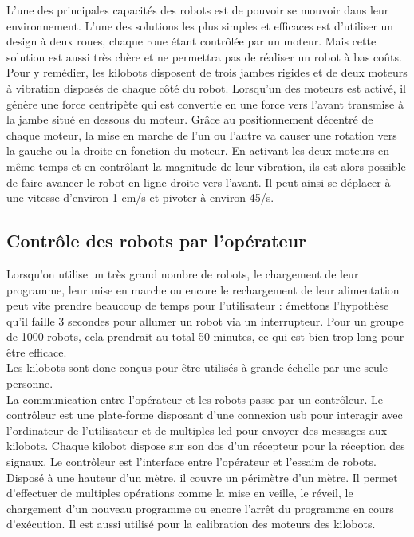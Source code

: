 \documentclass[a4paper,8pt]{report}
\begin{document}
L'une des principales capacit\'es des robots est de pouvoir se mouvoir dans leur environnement. L'une des solutions les plus simples et efficaces est d'utiliser un design \`a deux roues, chaque roue \'etant contr\^ol\'ee par un moteur. Mais cette solution est aussi tr\`es ch\`ere et ne permettra pas de r\'ealiser un robot \`a bas co\^uts. \\
Pour y rem\'edier, les kilobots disposent de trois jambes rigides et de deux moteurs \`a vibration dispos\'es de chaque c\^ot\'e du robot. Lorsqu'un des moteurs est activ\'e, il g\'en\`ere une force centrip\`ete qui est convertie en une force vers l'avant transmise \`a la jambe situ\'e en dessous du moteur. Gr\^ace au positionnement d\'ecentr\'e de chaque moteur, la mise en marche de l'un ou l'autre va causer une rotation vers la gauche ou la droite en fonction du moteur. En activant les deux moteurs en m\^eme temps et en contr\^olant la magnitude de leur vibration, ils est alors possible de faire avancer le robot en ligne droite vers l'avant. Il peut ainsi se d\'eplacer \`a une vitesse d'environ 1 cm/s et pivoter \`a environ 45\degre/s.\\

\subsection*{Contr\^ole des robots par l'op\'erateur}\label{subsec:name}

Lorsqu'on utilise un tr\`es grand nombre de robots, le chargement de leur programme, leur mise en marche ou encore le rechargement de leur alimentation peut vite prendre beaucoup de temps pour l'utilisateur : \'emettons l'hypoth\`ese qu'il faille 3 secondes pour allumer un robot via un interrupteur. Pour un groupe de 1000 robots, cela prendrait au total 50 minutes, ce qui est bien trop long pour \^etre efficace. \\
Les kilobots sont donc con\c cus pour \^etre utilis\'es \`a grande \'echelle par une seule personne.\\

\medskip
La communication entre l'op\'erateur et les robots passe par un contr\^oleur. Le contr\^oleur est une plate-forme disposant d'une connexion usb pour interagir avec l'ordinateur de l'utilisateur et de multiples led pour envoyer des messages aux kilobots. Chaque kilobot dispose sur son dos d'un r\'ecepteur pour la r\'eception des signaux. Le contr\^oleur est l'interface entre l'op\'erateur et l'essaim de robots. Dispos\'e \`a une hauteur d'un m\`etre, il couvre un p\'erim\`etre d'un m\`etre. Il permet d'effectuer de multiples op\'erations comme la mise en veille, le r\'eveil, le chargement d'un nouveau programme ou encore l'arr\^et du programme en cours d'ex\'ecution. Il est aussi utilis\'e pour la calibration des moteurs des kilobots.\\
\end{document}
